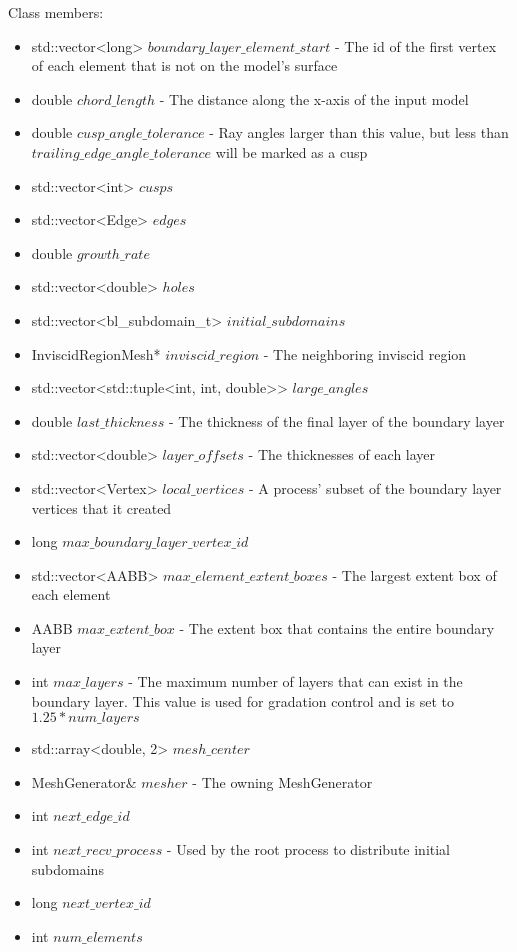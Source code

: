 \documentclass[manuscript, screen]{acmart}
\begin{document}
Class members:
\begin{itemize}
\item std::vector<long> $boundary\_layer\_element\_start$ - The id of the first vertex of each element that is not on the model's surface
\item double $chord\_length$ - The distance along the x-axis of the input model
\item double $cusp\_angle\_tolerance$ - Ray angles larger than this value, but less than $trailing\_edge\_angle\_tolerance$ will be marked as a cusp
\item std::vector<int> $cusps$
\item std::vector<Edge> $edges$
\item double $growth\_rate$
\item std::vector<double> $holes$
\item std::vector<bl\_subdomain\_t> $initial\_subdomains$
\item InviscidRegionMesh* $inviscid\_region$ - The neighboring inviscid region
\item std::vector<std::tuple<int, int, double>> $large\_angles$
\item double $last\_thickness$ - The thickness of the final layer of the boundary layer
\item std::vector<double> $layer\_offsets$ - The thicknesses of each layer
\item std::vector<Vertex> $local\_vertices$ - A process' subset of the boundary layer vertices that it created
\item long $max\_boundary\_layer\_vertex\_id$
\item std::vector<AABB> $max\_element\_extent\_boxes$ - The largest extent box of each element
\item AABB $max\_extent\_box$ - The extent box that contains the entire boundary layer
\item int $max\_layers$ - The maximum number of layers that can exist in the boundary layer. This value is used for gradation control and is set to $1.25 * num\_layers$
\item std::array<double, 2> $mesh\_center$
\item MeshGenerator\& $mesher$ - The owning MeshGenerator
\item int $next\_edge\_id$
\item int $next\_recv\_process$ - Used by the root process to distribute initial subdomains
\item long $next\_vertex\_id$
\item int $num\_elements$

\end{itemize}
\end{document}
